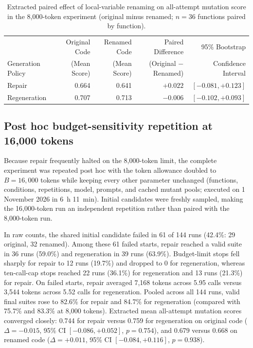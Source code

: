 \documentclass[11pt,a4paper]{article}
\begin{document}
\begin{table}[htbp]
\centering\footnotesize
\caption{Extracted paired effect of local-variable renaming on all-attempt mutation score in the 8{,}000-token experiment (original minus renamed; $n = 36$ functions paired by function).}
\label{tab:renaming}
\begin{tabular}{@{}lrrrr@{}}
\toprule
 & Original Code & Renamed Code & Paired Difference & 95\% Bootstrap \\
Generation Policy & (Mean Score) & (Mean Score) & (Original $-$ Renamed) & Confidence Interval \\
\midrule
Repair & 0.664 & 0.641 & $+0.022$ & $[-0.081, +0.123]$ \\
Regeneration & 0.707 & 0.713 & $-0.006$ & $[-0.102, +0.093]$ \\
\bottomrule
\end{tabular}
\end{table}

\subsection{Post hoc budget-sensitivity repetition at 16{,}000 tokens}\label{sec:sens}
Because repair frequently halted on the 8{,}000-token limit, the complete experiment was repeated post hoc with the token allowance doubled to $B = 16{,}000$ tokens while keeping every other parameter unchanged (functions, conditions, repetitions, model, prompts, and cached mutant pools; executed on 1 November 2026 in 6~h 11~min). Initial candidates were freshly sampled, making the 16{,}000-token run an independent repetition rather than paired with the 8{,}000-token run.

In raw counts, the shared initial candidate failed in 61 of 144 runs (42.4\%: 29 original, 32 renamed). Among these 61 failed starts, repair reached a valid suite in 36 runs (59.0\%) and regeneration in 39 runs (63.9\%). Budget-limit stops fell sharply for repair to 12 runs (19.7\%) and dropped to 0 for regeneration, whereas ten-call-cap stops reached 22 runs (36.1\%) for regeneration and 13 runs (21.3\%) for repair. On failed starts, repair averaged 7{,}168 tokens across 5.95 calls versus 3{,}544 tokens across 5.52 calls for regeneration. Pooled across all 144 runs, valid final suites rose to 82.6\% for repair and 84.7\% for regeneration (compared with 75.7\% and 83.3\% at 8{,}000 tokens). Extracted mean all-attempt mutation scores converged closely: 0.744 for repair versus 0.759 for regeneration on original code ($\Delta = -0.015$, 95\% CI $[-0.086, +0.052]$, $p = 0.754$), and 0.679 versus 0.668 on renamed code ($\Delta = +0.011$, 95\% CI $[-0.084, +0.116]$, $p = 0.938$).
\end{document}

